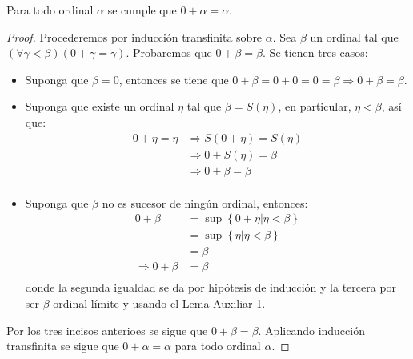 \documentclass[12pt]{article}
\newcounter{it}
\theoremstyle{largebreak}
\begin{document}
    \begin{propo}
        Para todo ordinal $\alpha$ se cumple que $0+\alpha=\alpha$.
    \end{propo}

    \begin{proof}
        Procederemos por inducción transfinita sobre $\alpha$. Sea $\beta$ un ordinal tal que $(\forall\gamma<\beta)(0+\gamma=\gamma)$. Probaremos que $0+\beta=\beta$. Se tienen tres casos:
        \begin{itemize}
            \item Suponga que $\beta=0$, entonces se tiene que $0+\beta=0+0=0=\beta\Rightarrow 0+\beta=\beta$.
            \item Suponga que existe un ordinal $\eta$ tal que $\beta=S(\eta)$, en particular, $\eta<\beta$, así que:
            \begin{equation*}
                \begin{split}
                    0+\eta=\eta&\Rightarrow S(0+\eta)=S(\eta)\\
                    &\Rightarrow 0+S(\eta)=\beta\\
                    &\Rightarrow0+\beta=\beta\\
                \end{split}
            \end{equation*}
            \item Suponga que $\beta$ no es sucesor de ningún ordinal, entonces:
            \begin{equation*}
                \begin{split}
                    0+\beta&=\sup\left\{0+\eta\Big|\eta<\beta \right\}\\
                    &=\sup\left\{\eta\Big|\eta<\beta \right\}\\
                    &=\beta\\
                    \Rightarrow 0+\beta&=\beta\\
                \end{split}
            \end{equation*}
            donde la segunda igualdad se da por hipótesis de inducción y la tercera por ser $\beta$ ordinal límite y usando el Lema Auxiliar 1.
        \end{itemize}
        Por los tres incisos anterioes se sigue que $0+\beta=\beta$. Aplicando inducción transfinita se sigue que $0+\alpha=\alpha$ para todo ordinal $\alpha$.
    \end{proof}
\end{document}
